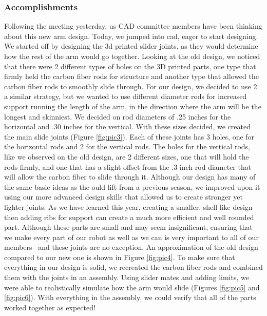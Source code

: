 \subsubsection*{Accomplishments}
Following the meeting yesterday, us CAD committee members have been thinking about this new arm design. Today, we jumped into cad, eager to start designing. We started off by designing the 3d printed slider joints, as they would determine how the rest of the arm would go together. Looking at the old design, we noticed that there were 2 different types of holes on the 3D printed parts, one type that firmly held the carbon fiber rods for structure and another type that allowed the carbon fiber rods to smoothly slide through. For our design, we decided to use 2 a similar strategy, but we wanted to use different diameter rods for increased support running the length of the arm, in the direction where the arm will be the longest and skinniest. We decided on rod diameters of .25 inches for the horizontal and .30 inches for the vertical. With these sizes decided, we created the main slide joints (Figure \ref{fig:pic3}). Each of these joints has 3 holes, one for the horizontal rods and 2 for the vertical rods. The holes for the vertical rods, like we observed on the old design, are 2 different sizes, one that will hold the rods firmly, and one that has a slight offset from the .3 inch rod diameter that will allow the carbon fiber to slide through it. 
Although our design has many of the same basic ideas as the ould lift from a previous season, we improved upon it using our more advanced design skills that allowed us to create stronger yet lighter joints. As we have learned this year, creating a smaller, shell like design then adding ribs for support can create a much more efficient and well rounded part. Although these parts are small and may seem insignificant, ensuring that we make every part of our robot as well as we can is very important to all of our members-- and these joints are no exception. An approximation of the old design compared to our new one is shown in Figure \ref{fig:pic4}.
To make sure that everything in our design is solid, we recreated the carbon fiber rods and combined them with the joints in an assembly. Using slider mates and adding limits, we were able to realistically simulate how the arm would slide (Figures \ref{fig:pic5} and \ref{fig:pic6}). With everything in the assembly, we could verify that all of the parts worked together as expected!



